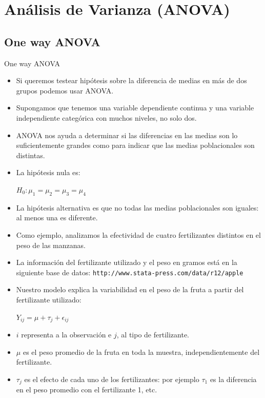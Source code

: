 \documentclass{beamer}
\begin{document}
\section{Análisis de Varianza (ANOVA)}

\subsection{One way ANOVA}

\begin{frame}[allowframebreaks]{One way ANOVA}
\begin{itemize}
\item Si queremos testear hipótesis sobre la diferencia de medias en más de dos grupos podemos usar ANOVA.
\item Supongamos que tenemos una variable dependiente continua y una variable independiente categórica con muchos niveles, no solo dos.
\item ANOVA nos ayuda a determinar si las diferencias en las medias son lo suficientemente grandes como para indicar que las medias poblacionales son distintas. 
\item La hipótesis nula es: \\
\begin{center}
$H_{0}: \mu_{1} =  \mu_{2} = \mu_{3} = \mu_{4}$
\end{center}
\item La hipótesis alternativa es que no todas las medias poblacionales son iguales: al menos una es diferente.
\item Como ejemplo, analizamos la efectividad de cuatro fertilizantes distintos en el peso de las manzanas. 
\item La información del fertilizante utilizado y el peso en gramos está en la siguiente base de datos: \small{\texttt{http://www.stata-press.com/data/r12/apple}}
\item Nuestro modelo explica la variabilidad en el peso de la fruta a partir del fertilizante utilizado: \\
\begin{center}
$Y_{ij}= \mu + \tau_{j} + \epsilon_{ij}$
\end{center}
\item $i$ representa a la observación e $j$, al tipo de fertilizante. 
\item $\mu$ es el peso promedio de la fruta en toda la muestra, independientemente del fertilizante. 
\item $\tau_{j}$ es el efecto de cada uno de los fertilizantes: por ejemplo $\tau_{1}$ es la diferencia en el peso promedio con el fertilizante 1, etc.

\end{itemize}
\end{frame}
\end{document}
